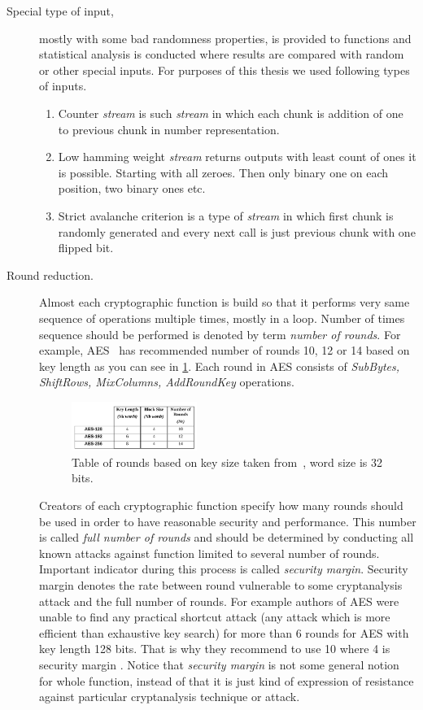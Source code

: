 \documentclass[
    digital,    %
    oneside,    %
    color,
    11pt,
    nocover,
    notable,
    nolof,
    nolot,
    final
]{fithesis3}
\begin{document}
\begin{description}
	\item[Special type of input,] mostly with some bad randomness properties, is provided to functions and statistical analysis is conducted where results are compared with random or other special inputs. For purposes of this thesis we used following types of inputs.
	\begin{enumerate}
		\item Counter \textit{stream} is such \textit{stream} in which each chunk is addition of one to previous chunk in number representation.
		\item Low hamming weight \textit{stream} returns outputs with least count of ones it is possible. Starting with all zeroes. Then only binary one on each position, two binary ones etc.
		\item Strict avalanche criterion is a type of \textit{stream} in which first chunk is randomly generated and every next call is just previous chunk with one flipped bit.
	\end{enumerate}

	\item[Round reduction.] Almost each cryptographic function is build so that it performs very same sequence of operations multiple times, mostly in a loop. Number of times sequence should be performed is denoted by term \textit{number of rounds}. For example, AES~\cite{FIPS-197} has recommended number of rounds 10, 12 or 14 based on key length as you can see in \cref{fig:fips197-rounds}. Each round in AES consists of \textit{SubBytes, ShiftRows, MixColumns, AddRoundKey} operations.
	
	\begin{figure}[h]
		\centering
		\includegraphics[width=0.4\textwidth]{./images/pictures/FIPS197-Nr-table.png}
		\caption{Table of rounds based on key size taken from~\cite{FIPS-197}, word size is 32 bits.}
		\label{fig:fips197-rounds}
	\end{figure}

	Creators of each cryptographic function specify how many rounds should be used in order to have reasonable security and performance. This number is called \textit{full number of rounds} and should be determined by conducting all known attacks against function limited to several number of rounds. Important indicator during this process is called \textit{security margin}. Security margin denotes the rate between round vulnerable to some cryptanalysis attack and the full number of rounds. For example authors of AES were unable to find any practical shortcut attack (any attack which is more efficient than exhaustive key search) for more than 6 rounds for AES with key length 128 bits. That is why they recommend to use 10 where 4 is security margin \cite{daemen1999aes}. Notice that \textit{security margin} is not some general notion for whole function, instead of that it is just kind of expression of resistance against particular cryptanalysis technique or attack.
	

\end{description}
\end{document}
